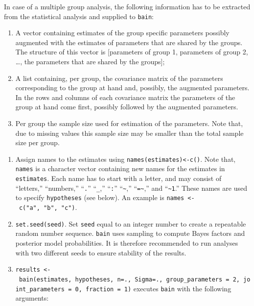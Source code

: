 \documentclass[
]{book}
\providecommand{\tightlist}{%
  \setlength{\itemsep}{0pt}\setlength{\parskip}{0pt}}
\begin{document}
In case of a multiple group
analysis, the following information has to be extracted from the statistical
analysis and supplied to \texttt{bain}:

\begin{enumerate}
\def\labelenumi{\alph{enumi})}
\tightlist
\item
  A vector containing estimates of the group specific
  parameters possibly augmented with the
  estimates of parameters that are shared by the groups. The structure
  of this vector is
  {[}parameters of group 1, parameters of group 2, \ldots, the parameters that
  are shared by the groups{]};
\item
  A list containing, per group, the covariance
  matrix of the parameters corresponding to the group at hand and, possibly,
  the augmented parameters. In the rows and columns of each covariance matrix
  the parameters of the group at hand come first, possibly followed by the
  augmented parameters.
\item
  Per group the sample size used for estimation of the parameters. Note that,
  due to missing values this sample size may be smaller than the total sample
  size per group.
\end{enumerate}

\begin{enumerate}
\def\labelenumi{\arabic{enumi})}
\setcounter{enumi}{1}
\tightlist
\item
  Assign names to the estimates
  using \texttt{names(estimates)\textless{}-c()}. Note that, \texttt{names} is a
  character vector containing new names for the estimates in \texttt{estimates}.
  Each name has to start with a letter, and may consist of ``letters,''
  ``numbers,'' ``\texttt{.}'' ``\texttt{\_},'' ``\texttt{:}'' ``\texttt{\textasciitilde{}},'' ``\texttt{=\textasciitilde{}},'' and ``\texttt{\textasciitilde{}1}.''
  These names are
  used to specify \texttt{hypotheses}
  (see below). An example is \texttt{names\ \textless{}-\ c("a",\ "b",\ "c")}.
\item
  \texttt{set.seed(seed)}. Set \texttt{seed} equal to an integer
  number to create a repeatable random number sequence. \texttt{bain} uses sampling to compute Bayes factors and posterior model probabilities. It is therefore recommended to run analyses with two different seeds to ensure stability of the results.
\item
  \texttt{results\ \textless{}-\ bain(estimates,\ hypotheses,\ n=.,\ Sigma=.,\ group\_parameters\ =\ 2,\ joint\_parameters\ =\ 0,\ fraction\ =\ 1)}
  executes \texttt{bain} with the
  following arguments:
\end{enumerate}
\end{document}
